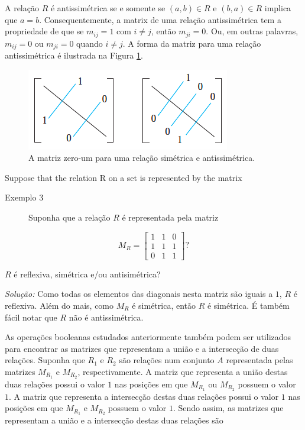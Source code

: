 A relação $R$ é antissimétrica se e somente se $(a, b) \in R$ e $(b, a) \in R$ implica que $a = b$. Consequentemente,
a matrix de uma relação antissimétrica tem a propriedade de que se $m_{ij} = 1$ com $i \ne j$, então $m_{ji} = 0$.
Ou, em outras palavras, $m_{ij} =0$ ou $m_{ji} =0$ quando $i \ne j$. A forma da matriz para uma relação antissimétrica
é ilustrada na Figura \ref{Figura62}.

\begin{figure}[H]
	\centering
	\includegraphics[scale=0.75]{aulas/imagens/62}
	\caption{A matriz zero-um para uma relação simétrica e antissimétrica.}
	\label{Figura62}
\end{figure}

Suppose that the relation R on a set is represented by the matrix

\begin{description}
	\item[Exemplo 3]{Suponha que a relação $R$ é representada pela matriz}
\end{description}
\[
	M_R = \begin{bmatrix}
	1 & 1 & 0\\
	1 & 1 & 1\\
	0 & 1 & 1
	\end{bmatrix}?
\]

$R$ é reflexiva, simétrica e/ou antisimétrica?

\emph{Solução:} Como todas os elementos das diagonais nesta matriz são iguais a $1$, $R$ é reflexiva.
Além do mais, como $M_R$ é simétrica, então $R$ é simétrica. É também fácil notar que $R$ não é antissimétrica.


As operações booleanas estudados anteriormente também podem ser utilizados para encontrar as matrizes que 
representam a união e a intersecção de duas relações. Suponha que $R_1$ e $R_2$ são relações num conjunto $A$
representada pelas matrizes $M_{R_1}$ e $M_{R_2}$, respectivamente. A matriz que representa a união destas duas
relações possui o valor $1$ nas posições em que  $M_{R_1}$ ou $M_{R_2}$ possuem o valor $1$. A matriz que representa a
intersecção destas duas relações possui o valor $1$ nas posições em que  $M_{R_1}$ e $M_{R_2}$ possuem o valor $1$.
Sendo assim, as matrizes que representam a união e a intersecção destas duas relações são


